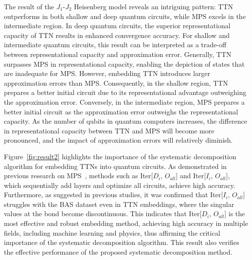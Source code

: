 \documentclass[12pt,dvipdfmx,twoside,openright]{report}
\begin{document}
The result of the $J_1$-$J_2$ Heisenberg model reveals an intriguing pattern: TTN outperforms in both shallow and deep quantum circuits, while MPS excels in the intermediate region.
In deep quantum circuits, the superior representational capacity of TTN results in enhanced convergence accuracy.
For shallow and intermediate quantum circuits, this result can be interpreted as a trade-off between representational capacity and approximation error.
Generally, TTN surpasses MPS in representational capacity, enabling the depiction of states that are inadequate for MPS.
However, embedding TTN introduces larger approximation errors than MPS. 
Consequently, in the shallow region, TTN prepares a better initial circuit due to its representational advantage outweighing the approximation error.
Conversely, in the intermediate region, MPS prepares a better initial circuit as the approximation error outweighs the representational capacity. 
As the number of qubits in quantum computers increases, the difference in representational capacity between TTN and MPS will become more pronounced, and the impact of approximation errors will relatively diminish.

Figure~\ref{fig:result2} highlights the importance of the systematic decomposition algorithm for embedding TTNs into quantum circuits.
As demonstrated in previous research on MPS~\cite{mpsdecomp}, methods such as Iter[$D_i$, $O_{all}$] and Iter[$I_i$, $O_{all}$], which sequentially add layers and optimize all circuits, achieve high accuracy. 
Furthermore, as suggested in previous studies, it was confirmed that Iter[$I_i$, $O_{all}$] struggles with the BAS dataset even in TTN embeddings, where the singular values at the bond become discontinuous. 
This indicates that Iter[$D_i$, $O_{all}$] is the most effective and robust embedding method, achieving high accuracy in multiple fields, including machine learning and physics, thus affirming the critical importance of the systematic decomposition algorithm.
This result also verifies the effective performance of the proposed systematic decomposition method.





\cleardoublepage
\end{document}
